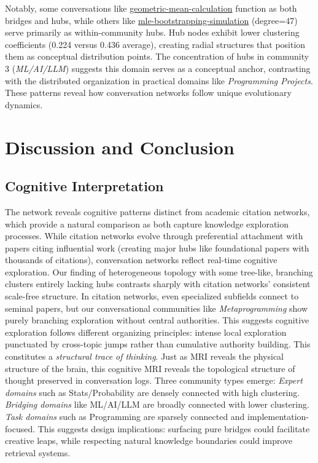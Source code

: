 \documentclass{svproc}
\begin{document}
Notably, some conversations like \url{geometric-mean-calculation} function as both bridges and hubs, while others like \url{mle-bootstrapping-simulation} (degree=47) serve primarily as within-community hubs. Hub nodes exhibit lower clustering coefficients (0.224 versus 0.436 average), creating radial structures that position them as conceptual distribution points. The concentration of hubs in community 3 (\emph{ML/AI/LLM}) suggests this domain serves as a conceptual anchor, contrasting with the distributed organization in practical domains like \emph{Programming Projects}. These patterns reveal how conversation networks follow unique evolutionary dynamics.

\section{Discussion and Conclusion}

\subsection{Cognitive Interpretation}

The network reveals cognitive patterns distinct from academic citation networks, which provide a natural comparison as both capture knowledge exploration processes. While citation networks evolve through preferential attachment with papers citing influential work (creating major hubs like foundational papers with thousands of citations), conversation networks reflect real-time cognitive exploration. Our finding of heterogeneous topology with some tree-like, branching clusters entirely lacking hubs contrasts sharply with citation networks' consistent scale-free structure. In citation networks, even specialized subfields connect to seminal papers, but our conversational communities like \emph{Metaprogramming} show purely branching exploration without central authorities. This suggests cognitive exploration follows different organizing principles: intense local exploration punctuated by cross-topic jumps rather than cumulative authority building. This constitutes a \emph{structural trace of thinking}. Just as MRI reveals the physical structure of the brain, this cognitive MRI reveals the topological structure of thought preserved in conversation logs. Three community types emerge: \emph{Expert domains} such as Stats/Probability are densely connected with high clustering. \emph{Bridging domains} like ML/AI/LLM are broadly connected with lower clustering. \emph{Task domains} such as Programming are sparsely connected and implementation-focused. This suggests design implications: surfacing pure bridges could facilitate creative leaps, while respecting natural knowledge boundaries could improve retrieval systems.
\end{document}
